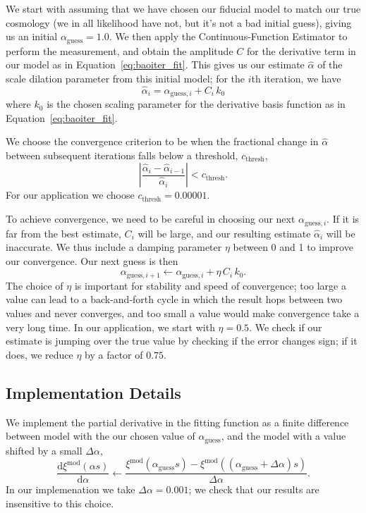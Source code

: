 \documentclass[modern]{aastex62}
\newcommand{\est}{the Continuous-Function Estimator\xspace}
\newcommand{\dd}{\mathrm{d}}
\begin{document}
We start with assuming that we have chosen our fiducial model to match our true cosmology (we in all likelihood have not, but it's not a bad initial guess), giving us an initial $\alpha_\mathrm{guess} = 1.0$. 
We then apply \est to perform the measurement, and obtain the amplitude $C$ for the derivative term in our model as in Equation~\ref{eq:baoiter_fit}. 
This gives us our estimate $\hat{\alpha}$ of the scale dilation parameter from this initial model; for the $i$th iteration, we have
\begin{equation}
    \hat{\alpha}_{i} = \alpha_{\mathrm{guess},i} + C_i \, k_0
\end{equation}
where $k_0$ is the chosen scaling parameter for the derivative basis function as in Equation~\ref{eq:baoiter_fit}.

We choose the convergence criterion to be when the fractional change in $\hat{\alpha}$ between subsequent iterations falls below a threshold, $c_\mathrm{thresh}$,
\begin{equation}
    \left| \frac{\hat{\alpha}_i - \hat{\alpha}_{i-1}}{\hat{\alpha}_i} \right| < c_\mathrm{thresh}.
\end{equation}
For our application we choose $c_\mathrm{thresh} = 0.00001$.

To achieve convergence, we need to be careful in choosing our next $\alpha_{\mathrm{guess},i}$.
If it is far from the best estimate, $C_i$ will be large, and our resulting estimate $\hat{\alpha}_{i}$ will be inaccurate.
We thus include a damping parameter $\eta$ between 0 and 1 to improve our convergence.
Our next guess is then
\begin{equation}
    \alpha_{\mathrm{guess},i+1} \leftarrow \alpha_{\mathrm{guess},i} + \eta\,C_i\,k_0.
\end{equation}
The choice of $\eta$ is important for stability and speed of convergence; too large a value can lead to a back-and-forth cycle in which the result hops between two values and never converges, and too small a value would make convergence take a very long time.
In our application, we start with $\eta=0.5$.
We check if our estimate is jumping over the true value by checking if the error changes sign; if it does, we reduce $\eta$ by a factor of $0.75$.

\subsection{Implementation Details}

We implement the partial derivative in the fitting function as a finite difference between model with the our chosen value of $\alpha_\mathrm{guess}$, and the model with a value shifted by a small $\Delta \alpha$,
\begin{equation}
    \frac{\dd \xi^\mathrm{mod}(\alpha s)}{\dd \alpha} \leftarrow \frac{\xi^\mathrm{mod}(\alpha_\mathrm{guess} s) - \xi^\mathrm{mod}((\alpha_\mathrm{guess} + \Delta \alpha)s)}{\Delta \alpha}.
\end{equation}
In our implemenation we take $\Delta \alpha = 0.001$; we check that our results are insensitive to this choice.
\end{document}
